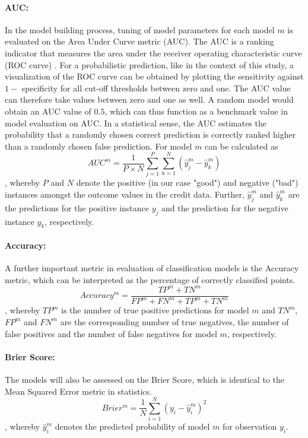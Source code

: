 \documentclass[12pt]{article}
\begin{document}
\paragraph{AUC:} In the model building process, tuning of model parameters for each model $m$ is evaluated on the Area Under Curve metric (AUC). The AUC is a ranking indicator that measures the area under the receiver operating characteristic curve (ROC curve) \citep{hanley1982meaning}. For a probabilistic prediction, like in the context of this study, a visualization of the ROC curve can be obtained by plotting the sensitivity against $1 -$ specificity for all cut-off thresholds between zero and one. The AUC value can therefore take values between zero and one as well. A random model would obtain an AUC value of $0.5$, which can thus function as a benchmark value in model evaluation on AUC. In a statistical sense, the AUC estimates the probability that a randomly chosen correct prediction is correctly ranked higher than a randomly chosen false prediction. For model $m$ can be calculated as
\begin{equation}
AUC^m = \frac{1}{P \times N}\sum_{j=1}^{P}\sum_{k=1}^{N}(\hat{y}^m_j - \hat{y}^m_k)
\end{equation}
, whereby $P$ and $N$ denote the positive (in our case "good") and negative ("bad") instances amongst the outcome values in the credit data. Further, $\hat{y}^m_j$ and $\hat{y}^m_k$ are the predictions for the positive instance $y_j$ and the prediction for the negative instance $y_k$, respectively.

\paragraph{Accuracy:} A further important metric in evaluation of classification models is the Accuracy metric, which can be interpreted as the percentage of correctly classified points.
\begin{equation}
Accuracy^m = \frac{TP^m + TN^m}{FP^m + FN^m + TP^m + TN^m}
\end{equation}
, whereby $TP^m$ is the number of true positive predictions for model $m$ and $TN^m$, $FP^m$ and $FN^m$ are the corresponding number of true negatives, the number of false positives and the number of false negatives for model $m$, respectively.

\paragraph{Brier Score:} The models will also be assessed on the Brier Score, which is identical to the Mean Squared Error metric in statistics.
\begin{equation}
Brier^m = \frac{1}{N}\sum_{i=1}^{N}(y_i - \hat{y}^m_i)^2
\end{equation}
, whereby $\hat{y}^m_i$ denotes the predicted probability of model $m$ for observation $y_i$. 
\end{document}
